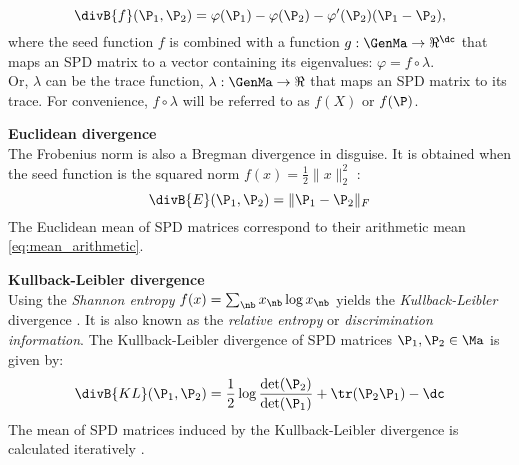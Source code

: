 \iflatexml\else {} \fi
\begin{equation}
\divB{f}(\P_1,\P_2) = \varphi(\P_1) - \varphi(\P_2) - \varphi'(\P_2)(\P_1 - \P_2),
\end{equation}
where the seed function $f$ is combined with a function $g: \GenMa \rightarrow \Re^\dc$ that maps an SPD matrix to a vector containing its eigenvalues: $\varphi = f \circ \lambda$.\\
Or, $\lambda$ can be the trace function, $\lambda: \GenMa \rightarrow \Re$ that maps an SPD matrix to its trace.
For convenience, $f \circ \lambda$ will be referred to as $f(X)$ or $f(\P)$. 

\iflatexml\else {} \fi

\textbf{Euclidean divergence} \\
The Frobenius norm is also a Bregman divergence in disguise. 
It is obtained when the seed function  is the squared norm $f(x) = \frac{1}{2} \lVert x \rVert_2^2$ \cite{dhillon_matrix_2007}:
\begin{equation}
\divB{E}(\P_1, \P_2) = \lVert \P_1-\P_2 \rVert _F
\label{eq:div-eucl}
\end{equation}
The Euclidean mean of SPD matrices correspond to their arithmetic mean \eqref{eq:mean_arithmetic}.

\textbf{Kullback-Leibler divergence} \\
Using the \emph{Shannon entropy} $f(x) = \sum_\nb x_\nb \log x_\nb$ yields the \emph{Kullback-Leibler} divergence \cite{nielsen_sided_2009}.
It is also known as the \emph{relative entropy} or \emph{discrimination information}. The Kullback-Leibler divergence of SPD matrices $\P_1, \P_2 \in \Ma$ is given by:
\begin{equation}
\divB{KL}(\P_1, \P_2) = \frac{1}{2} \log \frac{\det(\P_2)}{\det(\P_1)} + \tr(\P_2 \P_1) - \dc
\label{eq:div-kl}
\end{equation}
The mean of SPD matrices induced by the Kullback-Leibler divergence is calculated iteratively \cite{chebbi_means_2012}. 

